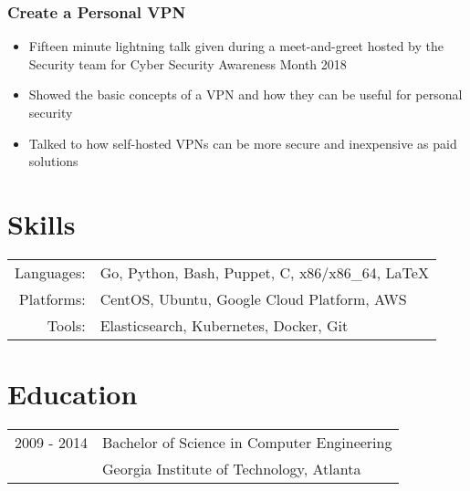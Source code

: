 \documentclass[letterpaper]{article}
\begin{document}
\subsubsection*{Create a Personal VPN}
\begin{itemize}[noitemsep]
	\item Fifteen minute lightning talk given during a meet-and-greet hosted by the Security team for Cyber Security Awareness Month 2018
	\item Showed the basic concepts of a VPN and how they can be useful for personal security
	\item Talked to how self-hosted VPNs can be more secure and inexpensive as paid solutions
\end{itemize}

\section*{Skills}
\begin{tabular}{rl}
    Languages: & Go, Python, Bash, Puppet, C, x86/x86\_64, \LaTeX\\
    Platforms: & CentOS, Ubuntu, Google Cloud Platform, AWS\\
    Tools: & Elasticsearch, Kubernetes, Docker, Git\\
\end{tabular}

\section*{Education}
\begin{tabular}{rl}
    2009 - 2014 & Bachelor of Science in {Computer Engineering}\\
    & {Georgia Institute of Technology}, Atlanta\\
\end{tabular}
\end{document}
